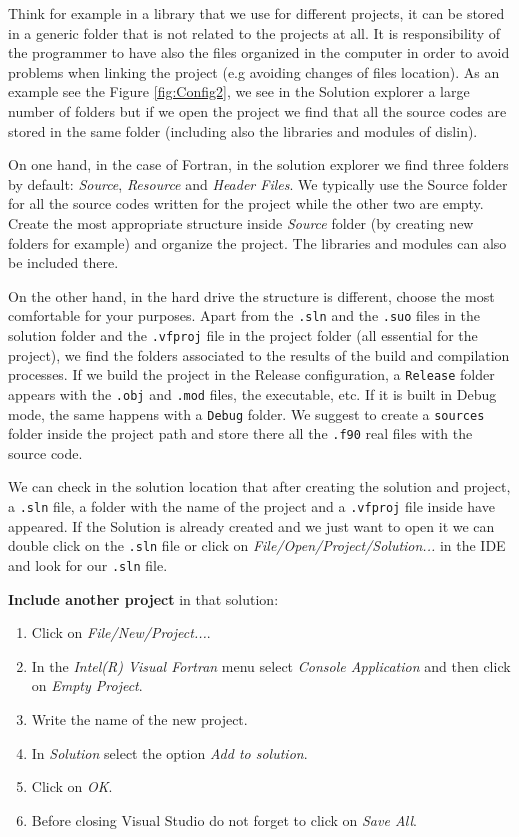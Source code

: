 Think for example in a library that we use for different projects, it can be stored in a generic folder that is not related to the projects at all. It is responsibility of the programmer to have also the files organized in the computer in order to avoid problems when linking the project (e.g avoiding changes of files location). As an example see the Figure \ref{fig:Config2}, we see in the Solution explorer a large number of folders but if we open the project we find that all the source codes are stored in the same folder (including also the libraries and modules of dislin).

On one hand, in the case of Fortran, in the solution explorer we find three folders by default: \textit{Source}, \textit{Resource} and \textit{Header Files}. We typically use the Source folder for all the source codes written for the project while the other two are empty. Create the most appropriate structure inside \textit{Source} folder (by creating new folders for example) and organize the project. The libraries and modules can also be included there. 

On the other hand, in the hard drive the structure is different, choose the most comfortable for your purposes. Apart from the \texttt{.sln} and the \texttt{.suo} files in the solution folder and the \texttt{.vfproj} file in the project folder (all essential for the project), we find the folders associated to the results of the build and compilation processes. If we build the project in the Release configuration, a \texttt{Release} folder appears with the \texttt{.obj} and \texttt{.mod} files, the executable, etc. If it is built in Debug mode, the same happens with a \texttt{Debug} folder. We suggest to create a \texttt{sources} folder inside the project path and store there all the \texttt{.f90} real files with the source code.

We can check in the solution location that after creating the solution and project, a \texttt{.sln} file, a folder with the name of the project and a \texttt{.vfproj} file inside have appeared. If the Solution is already created and we just want to open it we can double click on the \texttt{.sln} file or click on \textit{File/Open/Project/Solution...} in the IDE and look for our \texttt{.sln} file. 

\textbf{Include another project} in that solution:
\begin{enumerate}[nosep]
    \item Click on \textit{File/New/Project...}.
    \item In the \textit{Intel(R) Visual Fortran} menu select \textit{Console Application} and then click on \textit{Empty Project}.
    \item Write the name of the new project.
    \item In \textit{Solution} select the option \textit{Add to solution}.
    \item Click on \textit{OK}.
    \item Before closing Visual Studio do not forget to click on \textit{Save All}.
\end{enumerate}
    

